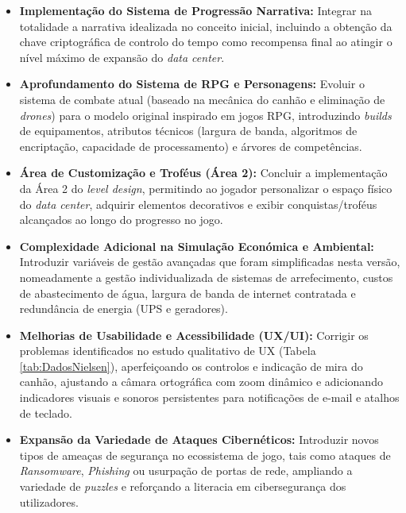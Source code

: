 \begin{itemize}
    \item \textbf{Implementação do Sistema de Progressão Narrativa:} Integrar na totalidade a narrativa idealizada no conceito inicial, incluindo a obtenção da chave criptográfica de controlo do tempo como recompensa final ao atingir o nível máximo de expansão do \textit{data center}.
    \item \textbf{Aprofundamento do Sistema de RPG e Personagens:} Evoluir o sistema de combate atual (baseado na mecânica do canhão e eliminação de \textit{drones}) para o modelo original inspirado em jogos RPG, introduzindo \textit{builds} de equipamentos, atributos técnicos (largura de banda, algoritmos de encriptação, capacidade de processamento) e árvores de competências.
    \item \textbf{Área de Customização e Troféus (Área 2):} Concluir a implementação da Área 2 do \textit{level design}, permitindo ao jogador personalizar o espaço físico do \textit{data center}, adquirir elementos decorativos e exibir conquistas/troféus alcançados ao longo do progresso no jogo.
    \item \textbf{Complexidade Adicional na Simulação Económica e Ambiental:} Introduzir variáveis de gestão avançadas que foram simplificadas nesta versão, nomeadamente a gestão individualizada de sistemas de arrefecimento, custos de abastecimento de água, largura de banda de internet contratada e redundância de energia (UPS e geradores).
    \item \textbf{Melhorias de Usabilidade e Acessibilidade (UX/UI):} Corrigir os problemas identificados no estudo qualitativo de UX (Tabela \ref{tab:DadosNielsen}), aperfeiçoando os controlos e indicação de mira do canhão, ajustando a câmara ortográfica com zoom dinâmico e adicionando indicadores visuais e sonoros persistentes para notificações de e-mail e atalhos de teclado.
    \item \textbf{Expansão da Variedade de Ataques Cibernéticos:} Introduzir novos tipos de ameaças de segurança no ecossistema de jogo, tais como ataques de \textit{Ransomware}, \textit{Phishing} ou usurpação de portas de rede, ampliando a variedade de \textit{puzzles} e reforçando a literacia em cibersegurança dos utilizadores.
\end{itemize}



